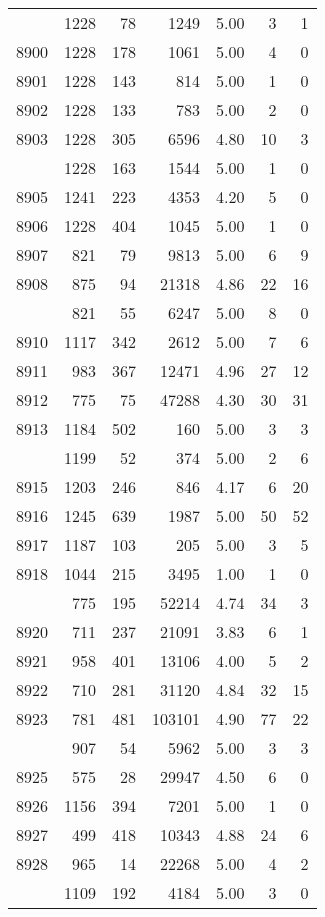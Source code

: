 \documentclass[
]{article}
\begin{document}
\begin{table}
\begin{tabular}[t]{lrrrrrr}
\addlinespace
8899 & 1228 & 78 & 1249 & 5.00 & 3 & 1\\
8900 & 1228 & 178 & 1061 & 5.00 & 4 & 0\\
8901 & 1228 & 143 & 814 & 5.00 & 1 & 0\\
8902 & 1228 & 133 & 783 & 5.00 & 2 & 0\\
8903 & 1228 & 305 & 6596 & 4.80 & 10 & 3\\
\addlinespace
8904 & 1228 & 163 & 1544 & 5.00 & 1 & 0\\
8905 & 1241 & 223 & 4353 & 4.20 & 5 & 0\\
8906 & 1228 & 404 & 1045 & 5.00 & 1 & 0\\
8907 & 821 & 79 & 9813 & 5.00 & 6 & 9\\
8908 & 875 & 94 & 21318 & 4.86 & 22 & 16\\
\addlinespace
8909 & 821 & 55 & 6247 & 5.00 & 8 & 0\\
8910 & 1117 & 342 & 2612 & 5.00 & 7 & 6\\
8911 & 983 & 367 & 12471 & 4.96 & 27 & 12\\
8912 & 775 & 75 & 47288 & 4.30 & 30 & 31\\
8913 & 1184 & 502 & 160 & 5.00 & 3 & 3\\
\addlinespace
8914 & 1199 & 52 & 374 & 5.00 & 2 & 6\\
8915 & 1203 & 246 & 846 & 4.17 & 6 & 20\\
8916 & 1245 & 639 & 1987 & 5.00 & 50 & 52\\
8917 & 1187 & 103 & 205 & 5.00 & 3 & 5\\
8918 & 1044 & 215 & 3495 & 1.00 & 1 & 0\\
\addlinespace
8919 & 775 & 195 & 52214 & 4.74 & 34 & 3\\
8920 & 711 & 237 & 21091 & 3.83 & 6 & 1\\
8921 & 958 & 401 & 13106 & 4.00 & 5 & 2\\
8922 & 710 & 281 & 31120 & 4.84 & 32 & 15\\
8923 & 781 & 481 & 103101 & 4.90 & 77 & 22\\
\addlinespace
8924 & 907 & 54 & 5962 & 5.00 & 3 & 3\\
8925 & 575 & 28 & 29947 & 4.50 & 6 & 0\\
8926 & 1156 & 394 & 7201 & 5.00 & 1 & 0\\
8927 & 499 & 418 & 10343 & 4.88 & 24 & 6\\
8928 & 965 & 14 & 22268 & 5.00 & 4 & 2\\
\addlinespace
8929 & 1109 & 192 & 4184 & 5.00 & 3 & 0\\

\end{tabular}
\end{table}
\end{document}
